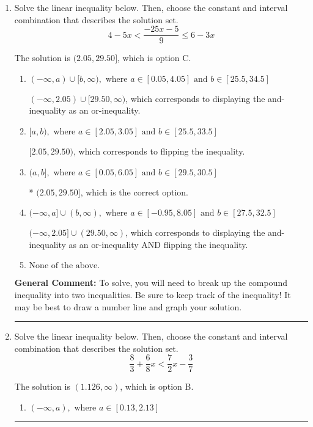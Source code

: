 \documentclass{extbook}[14pt]
\newcommand{\litem}[1]{\item #1

\rule{\textwidth}{0.4pt}}
\begin{document}
\begin{enumerate}
{\begin{enumerate}[label=\Alph*.]
You may have chosen this if you thought the inequality did not match the ends of the intervals.
\end{enumerate}

\textbf{General Comment:} Remember that less/greater than or equal to includes the endpoint, while less/greater do not. Also, remember that you need to flip the inequality when you multiply or divide by a negative.
}
\litem{
Solve the linear inequality below. Then, choose the constant and interval combination that describes the solution set.
\[ 4 - 5 x < \frac{-25 x - 5}{9} \leq 6 - 3 x \]

The solution is \( (2.05, 29.50] \), which is option C.\begin{enumerate}[label=\Alph*.]
\item \( (-\infty, a) \cup [b, \infty), \text{ where } a \in [0.05, 4.05] \text{ and } b \in [25.5, 34.5] \)

$(-\infty, 2.05) \cup [29.50, \infty)$, which corresponds to displaying the and-inequality as an or-inequality.
\item \( [a, b), \text{ where } a \in [2.05, 3.05] \text{ and } b \in [25.5, 33.5] \)

$[2.05, 29.50)$, which corresponds to flipping the inequality.
\item \( (a, b], \text{ where } a \in [0.05, 6.05] \text{ and } b \in [29.5, 30.5] \)

* $(2.05, 29.50]$, which is the correct option.
\item \( (-\infty, a] \cup (b, \infty), \text{ where } a \in [-0.95, 8.05] \text{ and } b \in [27.5, 32.5] \)

$(-\infty, 2.05] \cup (29.50, \infty)$, which corresponds to displaying the and-inequality as an or-inequality AND flipping the inequality.
\item \( \text{None of the above.} \)


\end{enumerate}

\textbf{General Comment:} To solve, you will need to break up the compound inequality into two inequalities. Be sure to keep track of the inequality! It may be best to draw a number line and graph your solution.
}
\litem{
Solve the linear inequality below. Then, choose the constant and interval combination that describes the solution set.
\[ \frac{8}{3} + \frac{6}{8} x < \frac{7}{2} x - \frac{3}{7} \]

The solution is \( (1.126, \infty) \), which is option B.\begin{enumerate}[label=\Alph*.]
\item \( (-\infty, a), \text{ where } a \in [0.13, 2.13] \)


\end{enumerate}}
\end{enumerate}
\end{document}
